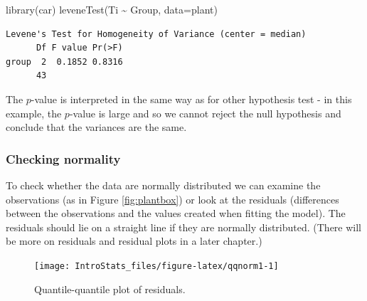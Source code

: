 \documentclass[
  oneside]{krantz}
\newenvironment{Shaded}{\begin{snugshade}}{\end{snugshade}}
\newcommand{\AttributeTok}[1]{\textcolor[rgb]{0.77,0.63,0.00}{#1}}
\newcommand{\CommentTok}[1]{\textcolor[rgb]{0.56,0.35,0.01}{\textit{#1}}}
\newcommand{\FunctionTok}[1]{\textcolor[rgb]{0.00,0.00,0.00}{#1}}
\newcommand{\NormalTok}[1]{#1}
\newcommand{\SpecialCharTok}[1]{\textcolor[rgb]{0.00,0.00,0.00}{#1}}
\begin{document}
\begin{Shaded}
\begin{Highlighting}[]
\FunctionTok{library}\NormalTok{(car)}
\FunctionTok{leveneTest}\NormalTok{(Ti }\SpecialCharTok{\textasciitilde{}}\NormalTok{ Group, }\AttributeTok{data=}\NormalTok{plant)}
\end{Highlighting}
\end{Shaded}

\begin{verbatim}
Levene's Test for Homogeneity of Variance (center = median)
      Df F value Pr(>F)
group  2  0.1852 0.8316
      43               
\end{verbatim}

The \(p\)-value is interpreted in the same way as for other hypothesis test - in this example, the \(p\)-value is large and so we cannot reject the null hypothesis and conclude that the variances are the same.

\hypertarget{checking-normality}{%
\subsubsection{Checking normality}\label{checking-normality}}

To check whether the data are normally distributed we can examine the observations (as in Figure \ref{fig:plantbox}) or look at the residuals (differences between the observations and the values created when fitting the model). The residuals should lie on a straight line if they are normally distributed. (There will be more on residuals and residual plots in a later chapter.)

\begin{Shaded}
\end{Shaded}

\begin{figure}

{\centering \texttt{[image: IntroStats\_files/figure-latex/qqnorm1-1]} 

}

\caption{Quantile-quantile plot of residuals.}\label{fig:qqnorm1}
\end{figure}
\end{document}
